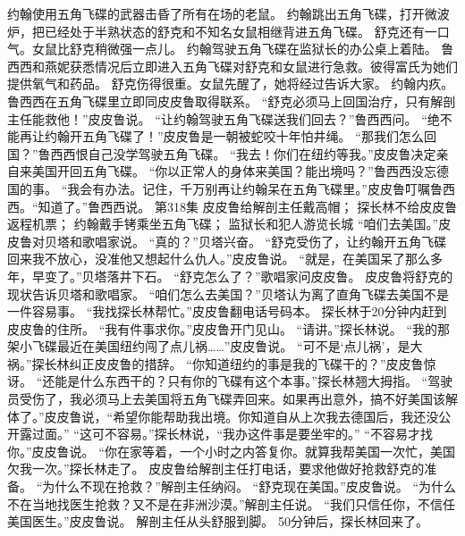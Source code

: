 \documentclass[a4paper,12pt,UTF8,twoside]{ctexbook}
\begin{document}
        约翰使用五角飞碟的武器击昏了所有在场的老鼠。  
        约翰跳出五角飞碟，打开微波炉，把已经处于半熟状态的舒克和不知名女鼠相继背进五角飞碟。  
        舒克还有一口气。女鼠比舒克稍微强一点儿。  
        约翰驾驶五角飞碟在监狱长的办公桌上着陆。  
        鲁西西和燕妮获悉情况后立即进入五角飞碟对舒克和女鼠进行急救。彼得富氏为她们提供氧气和药品。  
        舒克伤得很重。女鼠先醒了，她将经过告诉大家。  
        约翰内疚。  
        鲁西西在五角飞碟里立即同皮皮鲁取得联系。  
        “舒克必须马上回国治疗，只有解剖主任能救他！”皮皮鲁说。  
        “让约翰驾驶五角飞碟送我们回去？”鲁西西问。  
        “绝不能再让约翰开五角飞碟了！”皮皮鲁是一朝被蛇咬十年怕井绳。  
        “那我们怎么回国？”鲁西西恨自己没学驾驶五角飞碟。  
        “我去！你们在纽约等我。”皮皮鲁决定亲自来美国开回五角飞碟。  
        “你以正常人的身体来美国？能出境吗？”鲁西西没忘德国的事。  
        “我会有办法。记住，千万别再让约翰呆在五角飞碟里。”皮皮鲁叮嘱鲁西西。“知道了。”鲁西西说。          第318集  
        皮皮鲁给解剖主任戴高帽；  
        探长林不给皮皮鲁返程机票；  
        约翰戴手铐乘坐五角飞碟；  
        监狱长和犯人游览长城    
        “咱们去美国。”皮皮鲁对贝塔和歌唱家说。  
        “真的？”贝塔兴奋。  
        “舒克受伤了，让约翰开五角飞碟回来我不放心，没准他又想起什么仇人。”皮皮鲁说。  
        “就是，在美国呆了那么多年，早变了。”贝塔落井下石。  
        “舒克怎么了？”歌唱家问皮皮鲁。  
        皮皮鲁将舒克的现状告诉贝塔和歌唱家。  
        “咱们怎么去美国？”贝塔认为离了直角飞碟去美国不是一件容易事。  
        “我找探长林帮忙。”皮皮鲁翻电话号码本。        
        探长林于20分钟内赶到皮皮鲁的住所。  
        “我有件事求你。”皮皮鲁开门见山。  
        “请讲。”探长林说。  
        “我的那架小飞碟最近在美国纽约闯了点儿祸……”皮皮鲁说。  
        “可不是‘点儿祸’，是大祸。”探长林纠正皮皮鲁的措辞。  
        “你知道纽约的事是我的飞碟干的？”皮皮鲁惊讶。  
        “还能是什么东西干的？只有你的飞碟有这个本事。”探长林翘大拇指。  
        “驾驶员受伤了，我必须马上去美国将五角飞碟弄回来。如果再出意外，搞不好美国该解体了。”皮皮鲁说，“希望你能帮助我出境。你知道自从上次我去德国后，我还没公开露过面。”  
        “这可不容易。”探长林说，“我办这件事是要坐牢的。”  
        “不容易才找你。”皮皮鲁说。  
        “你在家等着，一个小时之内答复你。就算我帮美国一次忙，美国欠我一次。”探长林走了。  
        皮皮鲁给解剖主任打电话，要求他做好抢救舒克的准备。  
        “为什么不现在抢救？”解剖主任纳闷。  
        “舒克现在美国。”皮皮鲁说。        
        “为什么不在当地找医生抢救？又不是在非洲沙漠。”解剖主任说。  
        “我们只信任你，不信任美国医生。”皮皮鲁说。  
        解剖主任从头舒服到脚。  
        50分钟后，探长林回来了。  
\end{document}
